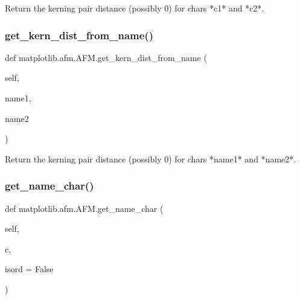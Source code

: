 \begin{DoxyVerb}Return the kerning pair distance (possibly 0) for chars *c1* and *c2*.
\end{DoxyVerb}
 \mbox{\label{classmatplotlib_1_1afm_1_1AFM_a3d3e0db1aa305145af9fc3afd58f444f}} 
\subsubsection{\texorpdfstring{get\+\_\+kern\+\_\+dist\+\_\+from\+\_\+name()}{get\_kern\_dist\_from\_name()}}
{\footnotesize\ttfamily def matplotlib.\+afm.\+A\+F\+M.\+get\+\_\+kern\+\_\+dist\+\_\+from\+\_\+name (\begin{DoxyParamCaption}\item[{}]{self,  }\item[{}]{name1,  }\item[{}]{name2 }\end{DoxyParamCaption})}

\begin{DoxyVerb}Return the kerning pair distance (possibly 0) for chars
*name1* and *name2*.
\end{DoxyVerb}
 \mbox{\label{classmatplotlib_1_1afm_1_1AFM_af32bdecad410d84fee541fed4f96a951}} 
\subsubsection{\texorpdfstring{get\+\_\+name\+\_\+char()}{get\_name\_char()}}
{\footnotesize\ttfamily def matplotlib.\+afm.\+A\+F\+M.\+get\+\_\+name\+\_\+char (\begin{DoxyParamCaption}\item[{}]{self,  }\item[{}]{c,  }\item[{}]{isord = {\ttfamily False} }\end{DoxyParamCaption})}

